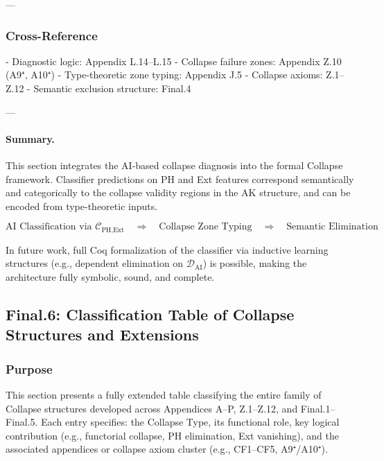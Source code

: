 \documentclass[11pt]{article}
\begin{document}
\begin{axiom}
\begin{axiom}
{{---

\subsubsection*{Cross-Reference}

- Diagnostic logic: Appendix L.14–L.15  
- Collapse failure zones: Appendix Z.10 (A9⁺, A10⁺)  
- Type-theoretic zone typing: Appendix J.5  
- Collapse axioms: Z.1–Z.12  
- Semantic exclusion structure: Final.4

---

\paragraph{Summary.}

This section integrates the AI-based collapse diagnosis into the formal Collapse framework.  
Classifier predictions on PH and Ext features correspond semantically and categorically  
to the collapse validity regions in the AK structure, and can be encoded from  
type-theoretic inputs.

\[
\boxed{
\text{AI Classification via } \mathcal{C}_{\text{PH,Ext}} \quad
\Rightarrow \quad \text{Collapse Zone Typing} \quad
\Rightarrow \quad \text{Semantic Elimination}
}
\]

In future work, full Coq formalization of the classifier via inductive learning structures  
(e.g., dependent elimination on \( \mathcal{D}_{\text{AI}} \)) is possible, making the architecture  
fully symbolic, sound, and complete.




\subsection*{Final.6: Classification Table of Collapse Structures and Extensions}

\subsubsection*{Purpose}

This section presents a fully extended table classifying  
the entire family of Collapse structures developed across Appendices A–P, Z.1–Z.12, and Final.1–Final.5.  
Each entry specifies: the Collapse Type, its functional role, key logical contribution (e.g., functorial collapse, PH elimination, Ext vanishing),  
and the associated appendices or collapse axiom cluster (e.g., CF1–CF5, A9⁺/A10⁺).

}}
\end{axiom}
\end{axiom}
\end{document}
